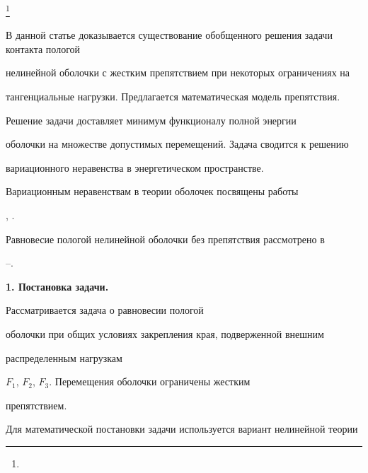 \thanks{}





\date{}




\pagestyle{plain} %







\maketitle


\label{begin}








В данной статье доказывается существование обобщенного решения задачи контакта пологой


нелинейной оболочки с жестким препятствием при некоторых ограничениях на


тангенциальные нагрузки. Предлагается математическая модель препятствия.


Решение задачи доставляет минимум функционалу полной энергии


оболочки на множестве допустимых перемещений. Задача сводится к решению


вариационного неравенства в энергетическом пространстве.


Вариационным неравенствам в теории оболочек посвящены работы


\cite{khludnev}, \cite{lvov}.


Равновесие пологой нелинейной оболочки без препятствия рассмотрено в


\cite{vorovich1999}--\cite{vorovich1988}.


\medskip





{\bf 1. Постановка задачи.}


Рассматривается задача о равновесии пологой


оболочки при общих условиях закрепления края, подверженной внешним


распределенным нагрузкам


$F_1$, $F_2$, $F_3$. Перемещения оболочки ограничены жестким


препятствием.


Для математической постановки задачи используется вариант нелинейной теории


